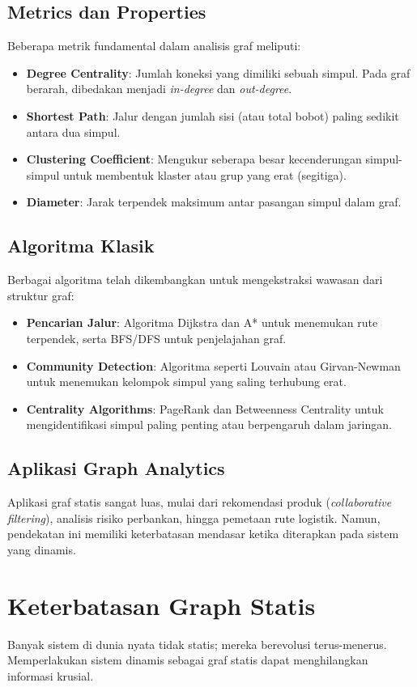 \documentclass[12pt,a4paper]{book}
\begin{document}
\subsection{Metrics dan Properties}
Beberapa metrik fundamental dalam analisis graf meliputi:
\begin{itemize}
    \item \textbf{Degree Centrality}: Jumlah koneksi yang dimiliki sebuah simpul. Pada graf berarah, dibedakan menjadi \textit{in-degree} dan \textit{out-degree}.
    \item \textbf{Shortest Path}: Jalur dengan jumlah sisi (atau total bobot) paling sedikit antara dua simpul.
    \item \textbf{Clustering Coefficient}: Mengukur seberapa besar kecenderungan simpul-simpul untuk membentuk klaster atau grup yang erat (segitiga).
    \item \textbf{Diameter}: Jarak terpendek maksimum antar pasangan simpul dalam graf.
\end{itemize}

\subsection{Algoritma Klasik}
Berbagai algoritma telah dikembangkan untuk mengekstraksi wawasan dari struktur graf:
\begin{itemize}
    \item \textbf{Pencarian Jalur}: Algoritma Dijkstra dan A* untuk menemukan rute terpendek, serta BFS/DFS untuk penjelajahan graf.
    \item \textbf{Community Detection}: Algoritma seperti Louvain atau Girvan-Newman untuk menemukan kelompok simpul yang saling terhubung erat.
    \item \textbf{Centrality Algorithms}: PageRank dan Betweenness Centrality untuk mengidentifikasi simpul paling penting atau berpengaruh dalam jaringan.
\end{itemize}

\subsection{Aplikasi Graph Analytics}
Aplikasi graf statis sangat luas, mulai dari rekomendasi produk (\textit{collaborative filtering}), analisis risiko perbankan, hingga pemetaan rute logistik. Namun, pendekatan ini memiliki keterbatasan mendasar ketika diterapkan pada sistem yang dinamis.

\section{Keterbatasan Graph Statis}
Banyak sistem di dunia nyata tidak statis; mereka berevolusi terus-menerus. Memperlakukan sistem dinamis sebagai graf statis dapat menghilangkan informasi krusial.
\end{document}
